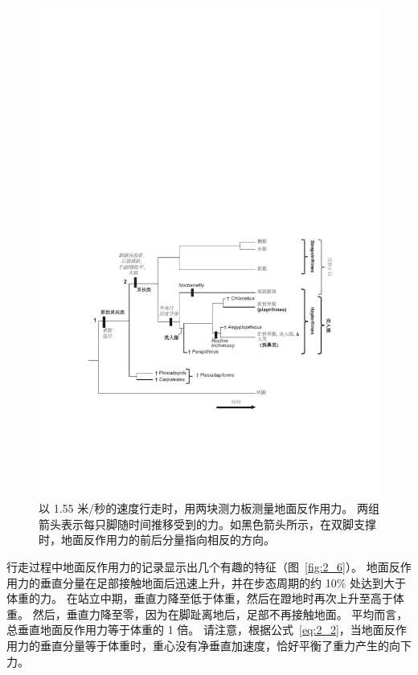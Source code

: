 \begin{figure}[!htb]
	\centering
	\includegraphics[width=0.9\linewidth]{chap2/2_5}
	\caption{以 1.55 米/秒的速度行走时，用两块测力板测量地面反作用力。
		两组箭头表示每只脚随时间推移受到的力。​​
		如黑色箭头所示，在双脚支撑时，地面反作用力的前后分量指向相反的方向。 \label{fig:2_5}}
\end{figure}


行走过程中地面反作用力的记录显示出几个有趣的特征（图~\ref{fig:2_6}）。
地面反作用力的垂直分量在足部接触地面后迅速上升，并在步态周期的约 10\% 处达到大于体重的力。
在站立中期，垂直力降至低于体重，然后在蹬地时再次上升至高于体重。
然后，垂直力降至零，因为在脚趾离地后，足部不再接触地面。
平均而言，总垂直地面反作用力等于体重的 1 倍。
请注意，根据公式~\ref{eq:2_2}，当地面反作用力的垂直分量等于体重时，重心没有净垂直加速度，恰好平衡了重力产生的向下力。


